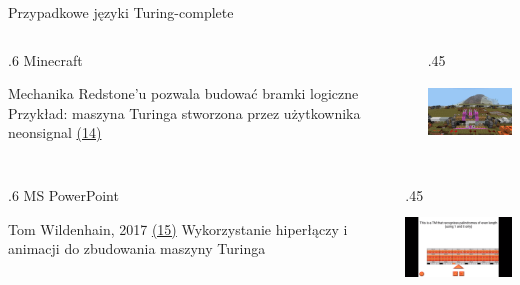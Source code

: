 \begin{frame}{Przypadkowe języki Turing-complete}

    \begin{columns}
        \begin{column}{.6\hsize}
            {Minecraft}
            {\footnotesize
            \begin{itemize}
                \myitem Mechanika Redstone'u pozwala budować bramki logiczne
                \myitem Przykład: maszyna Turinga stworzona przez użytkownika neonsignal {\color{blue} \hyperlink{frame:przypisy}{(14)}}
            \end{itemize}
            }
        \end{column}
        \begin{column}{.45\hsize}
            {\hspace{0cm}\includegraphics[height=2.2cm]{figures/turing_minecraft2.png}}
        \end{column}
    \end{columns}

    \begin{columns}
        \begin{column}{.6\hsize}
            {MS PowerPoint}
            {\footnotesize
            \begin{itemize}
                \myitem Tom Wildenhain, 2017 {\color{blue} \hyperlink{frame:przypisy}{(15)}}
                \myitem Wykorzystanie hiperłączy i animacji do zbudowania maszyny Turinga
            \end{itemize}
            }
        \end{column}
        \begin{column}{.45\hsize}
            {\hspace{0cm}\includegraphics[height=2.2cm]{figures/turing_powerpoint.png}}
        \end{column}
    \end{columns}


\end{frame}
